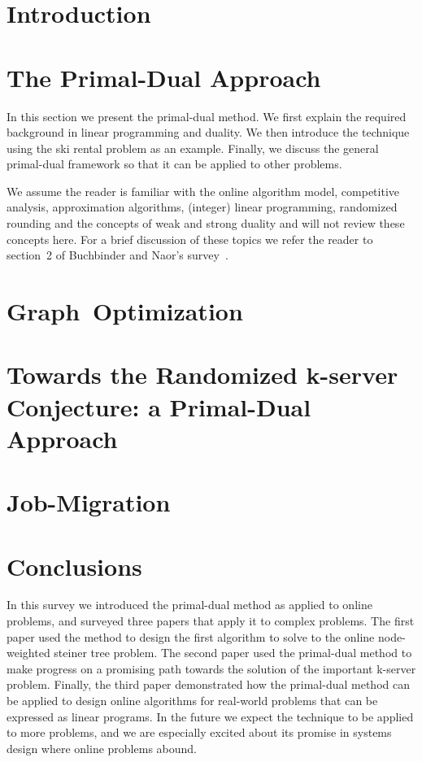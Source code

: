 \section{Introduction}
\label{intro}




\section{The Primal-Dual Approach}
\label{primal-dual}

In this section we present the primal-dual method.
We first explain the required background in linear programming and duality.
We then introduce the technique using the ski rental problem as an example.
Finally, we discuss the general primal-dual framework so that it can be applied to other problems.

We assume the reader is familiar with the online algorithm model, competitive analysis, approximation algorithms, (integer) linear programming, randomized rounding and the concepts of weak and strong duality and will not review these concepts here.
For a brief discussion of these topics we refer the reader to section~2 of Buchbinder and Naor's survey~\cite{buchbinder09:survey}.





\section{\mbox{Graph Optimization}}
\label{steiner-tree}


\section{Towards the Randomized k-server Conjecture: a Primal-Dual Approach}
\label{k-server}


\section{Job-Migration}
\label{job-migration}


\section{Conclusions}
In this survey we introduced the primal-dual method as applied to online problems, and surveyed three papers that apply it to complex problems.
The first paper used the method to design the first algorithm to solve to the online node-weighted steiner tree problem.
The second paper used the primal-dual method to make progress on a promising path towards the solution of the important k-server problem.
Finally, the third paper demonstrated how the primal-dual method can be applied to design online algorithms for real-world problems that can be expressed as linear programs.
In the future we expect the technique to be applied to more problems, and we are especially excited about its promise in systems design where online problems abound.





